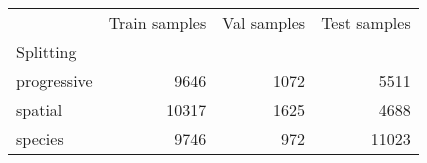\begin{tabular}{lrrr}
\toprule
{} &  Train samples &  Val samples &  Test samples \\
Splitting   &                &              &               \\
\midrule
progressive &           9646 &         1072 &          5511 \\
spatial     &          10317 &         1625 &          4688 \\
species     &           9746 &          972 &         11023 \\
\bottomrule
\end{tabular}
